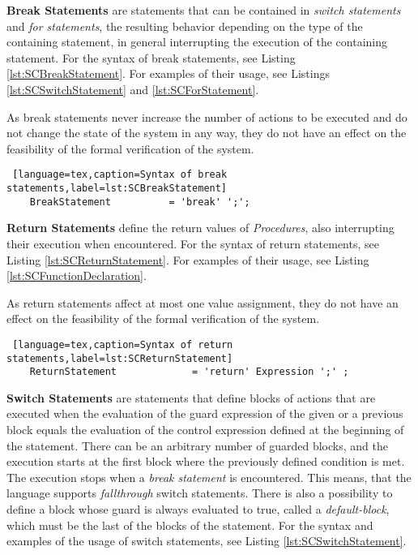 \bigskip
\textbf{Break Statements} are statements that can be contained in \textit{switch statements} and \textit{for statements}, the resulting behavior depending on the type of the containing statement, in general interrupting the execution of the containing statement. For the syntax of break statements, see Listing \ref{lst:SCBreakStatement}. For examples of their usage, see Listings \ref{lst:SCSwitchStatement} and \ref{lst:SCForStatement}.

As break statements never increase the number of actions to be executed and do not change the state of the system in any way, they do not have an effect on the feasibility of the formal verification of the system.
\bigskip
\begin{lstlisting} [language=tex,caption=Syntax of break statements,label=lst:SCBreakStatement]
	BreakStatement 			= 'break' ';';
\end{lstlisting}

\bigskip
\textbf{Return Statements} define the return values of \textit{Procedures}, also interrupting their execution when encountered. For the syntax of return statements, see Listing \ref{lst:SCReturnStatement}. For examples of their usage, see Listing \ref{lst:SCFunctionDeclaration}.

As return statements affect at most one value assignment, they do not have an effect on the feasibility of the formal verification of the system.
\bigskip
\begin{lstlisting} [language=tex,caption=Syntax of return statements,label=lst:SCReturnStatement]
	ReturnStatement 			= 'return' Expression ';' ;
\end{lstlisting}

\bigskip
\textbf{Switch Statements} are statements that define blocks of actions that are executed when the evaluation of the guard expression of the given or a previous block equals the evaluation of the control expression defined at the beginning of the statement. There can be an arbitrary number of guarded blocks, and the execution starts at the first block where the previously defined condition is met. The execution stops when a \textit{break statement} is encountered. This means, that the language supports \textit{fallthrough} switch statements. There is also a possibility to define a block whose guard is always evaluated to true, called a \textit{default-block}, which must be the last of the blocks of the statement. For the syntax and examples of the usage of switch statements, see Listing \ref{lst:SCSwitchStatement}.

